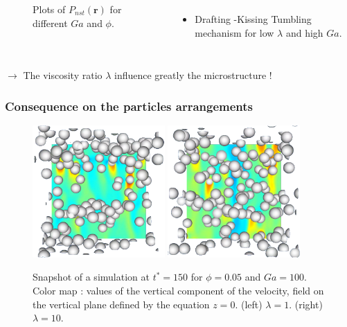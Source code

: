 \documentclass{sintefbeamer}
\begin{document}
\begin{frame}
\begin{columns}
      \begin{figure}
        \caption{Plots of $P_{nst} (\textbf{r})$ for different $Ga$ and $\phi$.}
      \end{figure}
    
    \begin{itemize}
      \item Drafting -Kissing Tumbling mechanism for low $\lambda$ and high $Ga$. 
    \end{itemize}
  \end{columns}
  $\to$ The viscosity ratio $\lambda$ influence greatly the microstructure ! 
\end{frame}

\begin{frame}
  \frametitle{Consequence on the particles arrangements}

  \begin{figure}[h!]
    \centering
    \includegraphics[width=0.45\textwidth]{image/HOMOGENEOUS_NEW/P_PHI_5_l_10_Ga_100.png}
    \includegraphics[width=0.45\textwidth]{image/HOMOGENEOUS_NEW/P_PHI_5_l_1_Ga_100.png}
    \caption{Snapshot of a simulation at $t^* = 150$ for $\phi=0.05$ and $Ga=100$.
    Color map : values of the vertical component of the velocity, field on the vertical plane defined by the equation $z=0$. 
    (left)  $\lambda = 1$.
    (right)  $\lambda = 10$.
    }
    \label{fig:images}
 \end{figure}

\end{frame}
\end{document}
